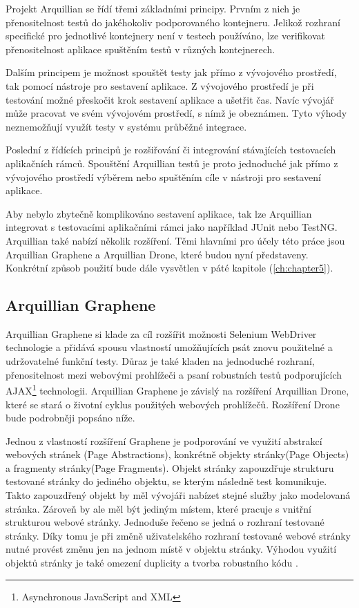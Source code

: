 \documentclass[
    color,   %
	table,   %
    twoside, %
    nolot, nolof
]{fithesis3}
\begin{document}
Projekt Arquillian se řídí třemi základními principy. Prvním z nich je přenositelnost testů do jakéhokoliv podporovaného kontejneru. Jelikož rozhraní specifické pro jednotlivé kontejnery není v testech používáno, lze verifikovat přenositelnost aplikace spuštěním testů v různých kontejnerech.

Dalším principem je možnost spouštět testy jak přímo z vývojového prostředí, tak pomocí nástroje pro sestavení aplikace. Z vývojového prostředí je při testování možné přeskočit krok sestavení aplikace a ušetřit čas. Navíc vývojář může pracovat ve svém vývojovém prostředí, s nímž je obeznámen. Tyto výhody neznemožňují využít testy v systému průběžné integrace.

Poslední z řídících principů je rozšiřování či integrování stávajících testovacích aplikačních rámců. Spouštění Arquillian testů je proto jednoduché jak přímo z vývojového prostředí výběrem  nebo spuštěním cíle  v nástroji pro sestavení aplikace.

Aby nebylo zbytečně komplikováno sestavení aplikace, tak lze Arquillian integrovat s testovacími aplikačními rámci jako například JUnit nebo TestNG. Arquillian také nabízí několik rozšíření. Těmi hlavními pro účely této práce jsou Arquillian Graphene a Arquillian Drone, které budou nyní představeny. Konkrétní způsob použití bude dále vysvětlen v páté kapitole (\ref{ch:chapter5}).

\subsection{Arquillian Graphene}
\label{subsec:3.2.1}

Arquillian Graphene si klade za cíl rozšířit možnosti Selenium WebDriver technologie a přidává spousu vlastností umožňujících psát znovu použitelné a udržovatelné funkční testy. Důraz je také kladen na jednoduché rozhraní, přenositelnost mezi webovými prohlížeči a psaní robustních testů podporujících AJAX\footnote{Asynchronous JavaScript and XML} technologii. Arquillian Graphene je závislý na rozšíření Arquillian Drone, které se stará o životní cyklus použitých webových prohlížečů. Rozšíření Drone bude podrobněji popsáno níže.

Jednou z vlastností rozšíření Graphene je podporování ve využití abstrakcí webových stránek (Page Abstractions), konkrétně objekty stránky(Page Objects) a fragmenty stránky(Page Fragments). Objekt stránky zapouzdřuje strukturu testované stránky do jediného objektu, se kterým následně test komunikuje. Takto zapouzdřený objekt by měl vývojáři nabízet stejné služby jako modelovaná stránka. Zároveň by ale měl být jediným místem, které pracuje s vnitřní strukturou webové stránky. Jednoduše řečeno se jedná o rozhraní testované stránky. Díky tomu je při změně uživatelského rozhraní testované webové stránky nutné provést změnu jen na jednom místě v objektu stránky. Výhodou využití objektů stránky je také omezení duplicity a tvorba robustního kódu \cite{Selenium}.
\end{document}
